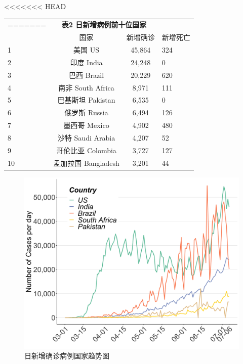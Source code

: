 \documentclass[
]{article}
\begin{document}
\begin{table}[H]
    \centering \begin{table}[H]
\centering\begingroup\fontsize{20}{22}\selectfont

<<<<<<< HEAD
\begin{tabular}{lccl}
=======
\begin{tabular}{rlrr}
>>>>>>> 4a25ed77dcc6617e9c899fe1aa0ff9489b487941
\toprule
\multicolumn{0}{c}{\textbf{ }} & \multicolumn{2}{c}{\textbf{表2 日新增病例前十位国家}} \\
  & 国家 & 新增确诊 & 新增死亡\\
\midrule
\rowcolor{gray!6}  1 & 美国 US & 45,864 & 324\\
2 & 印度 India & 24,248 & 0\\
\rowcolor{gray!6}  3 & 巴西 Brazil & 20,229 & 620\\
4 & 南非 South Africa & 8,971 & 111\\
\rowcolor{gray!6}  5 & 巴基斯坦 Pakistan & 6,535 & 0\\
6 & 俄罗斯 Russia & 6,494 & 126\\
\rowcolor{gray!6}  7 & 墨西哥 Mexico & 4,902 & 480\\
8 & 沙特 Saudi Arabia & 4,207 & 52\\
\rowcolor{gray!6}  9 & 哥伦比亚 Colombia & 3,727 & 127\\
10 & 孟加拉国 Bangladesh & 3,201 & 44\\
\bottomrule
\end{tabular}
\endgroup{}
\end{table} \end{table}
\vspace{-5mm}
\begin{figure}[H]
\centering
{}
\caption{日新增确诊病例国家趋势图}
\includegraphics[]{./input/covid2.png}
\end{figure}
\end{document}
